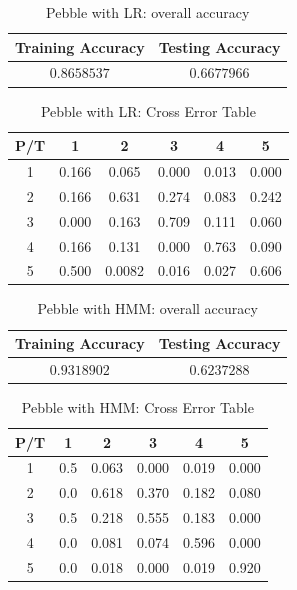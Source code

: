 \begin{table}[!htb]
\begin{center}
\begin{tabular}{c|c}
      \hline
      Training Accuracy & Testing Accuracy\\
      \hline
      $0.8658537$ & $0.6677966$ \\
      \hline
\end{tabular}
\caption{Pebble with LR: overall accuracy}
\label{tab:pebbleLR1}
\end{center}
\end{table}

\begin{table}[!htb]
\begin{center}
\begin{tabular}{c|c|c|c|c|c}
      \hline
      P/T& 1 & 2 &3 & 4 & 5 \\
      \hline
      1 &0.166&0.065&0.000&0.013&0.000\\
      2 &0.166&0.631&0.274&0.083&0.242\\
      3 &0.000&0.163&0.709&0.111&0.060\\
      4 &0.166&0.131&0.000&0.763&0.090\\
      5 &0.500&0.0082&0.016&0.027&0.606\\
      \hline
\end{tabular}
\caption{Pebble with LR: Cross Error Table}
\label{tab:pebbleLR2}
\end{center}
\end{table}

\begin{table}[!htb]
\begin{center}
\begin{tabular}{c|c}
      \hline
      Training Accuracy & Testing Accuracy\\
      \hline
      $0.9318902$ & $ 0.6237288$ \\
      \hline
\end{tabular}
\caption{Pebble with HMM: overall accuracy}
\label{tab:pebbleHMM1}
\end{center}
\end{table}
\begin{table}[!htb]
\begin{center}
\begin{tabular}{c|c|c|c|c|c}
      \hline
      P/T& 1 & 2 &3 & 4 & 5 \\
      \hline
      1 &0.5&0.063&0.000&0.019&0.000\\
      2 &0.0&0.618&0.370&0.182&0.080\\
      3 &0.5&0.218&0.555&0.183&0.000\\
      4 &0.0&0.081&0.074&0.596&0.000\\
      5 &0.0&0.018&0.000&0.019&0.920\\
      \hline
\end{tabular}
\caption{Pebble with HMM: Cross Error Table}
\label{tab:pebbleHMM2}
\end{center}
\end{table}

